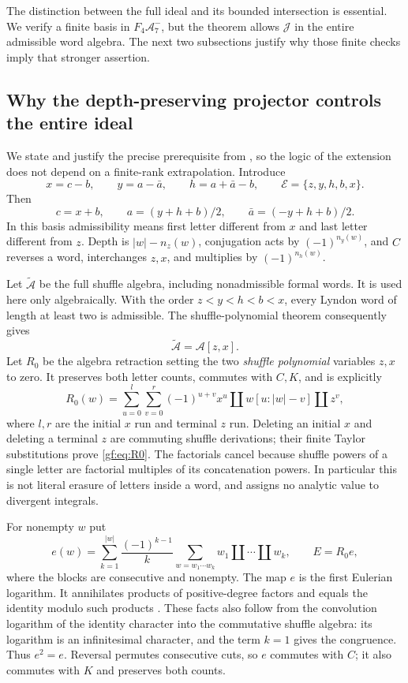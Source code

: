 \documentclass[11pt,a4paper]{article}
\numberwithin{equation}{section}
\theoremstyle{definition}
\theoremstyle{remark}
\providecommand{\shuffle}{\mathbin{\amalg}}
\begin{document}
The distinction between the full ideal and its bounded intersection is
essential. We verify a finite basis in $F_4\mathcal A_7^-$, but the theorem
allows $\mathcal J$ in the entire admissible word algebra. The next two
subsections justify why those finite checks imply that stronger assertion.

\subsection{Why the depth-preserving projector controls the entire ideal}

We state and justify the precise prerequisite from \cite{gf:Depth}, so the
logic of the extension does not depend on a finite-rank extrapolation.
Introduce
\[
 x=c-b,\qquad y=a-\bar a,\qquad h=a+\bar a-b,
 \qquad \mathcal E=\{z,y,h,b,x\}.
\]
Then
\[
 c=x+b,\qquad a=(y+h+b)/2,\qquad
 \bar a=(-y+h+b)/2.
\]
In this basis admissibility means first letter different from $x$ and last
letter different from $z$. Depth is $|w|-n_z(w)$, conjugation acts by
$(-1)^{n_y(w)}$, and $C$ reverses a word, interchanges $z,x$, and
multiplies by $(-1)^{n_h(w)}$.

Let $\widetilde{\mathcal A}$ be the full shuffle algebra, including
nonadmissible formal words. It is used here only algebraically. With the
order $z<y<h<b<x$, every Lyndon word of length at least two is admissible.
The shuffle-polynomial theorem \cite{gf:Radford} consequently gives
\[
 \widetilde{\mathcal A}=\mathcal A[z,x].
\]
Let $R_0$ be the algebra retraction setting the two \emph{shuffle polynomial}
variables $z,x$ to zero. It preserves both letter counts, commutes with
$C,K$, and is explicitly
\begin{equation}
 R_0(w)=\sum_{u=0}^{l}\sum_{v=0}^{r}(-1)^{u+v}
          x^u\shuffle w[u:|w|-v]\shuffle z^v,
 \label{gf:eq:R0}
\end{equation}
where $l,r$ are the initial $x$ run and terminal $z$ run. Deleting an
initial $x$ and deleting a terminal $z$ are commuting shuffle derivations;
their finite Taylor substitutions prove \eqref{gf:eq:R0}. The factorials
cancel because shuffle powers of a single letter are factorial multiples
of its concatenation powers. In particular this is not literal erasure
of letters inside a word, and assigns no analytic value to divergent
integrals.

For nonempty $w$ put
\begin{equation}
 e(w)=\sum_{k=1}^{|w|}\frac{(-1)^{k-1}}k
       \sum_{w=w_1\cdots w_k}w_1\shuffle\cdots\shuffle w_k,
 \qquad E=R_0e,
 \label{gf:eq:E}
\end{equation}
where the blocks are consecutive and nonempty. The map $e$ is the first
Eulerian logarithm. It annihilates products of positive-degree factors and
equals the identity modulo such products \cite{gf:Patras}. These facts
also follow from the convolution logarithm of the identity character
into the commutative shuffle algebra: its logarithm is an infinitesimal
character, and the term $k=1$ gives the congruence. Thus $e^2=e$.
Reversal permutes consecutive cuts, so $e$ commutes with $C$; it also
commutes with $K$ and preserves both counts.
\end{document}
